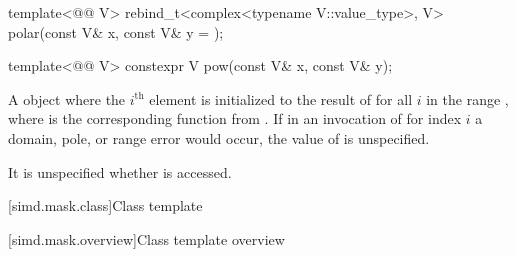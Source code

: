 \begin{itemdecl}
template<@@ V>
  rebind_t<complex<typename V::value_type>, V> polar(const V& x, const V& y = {});

template<@@ V> constexpr V pow(const V& x, const V& y);
\end{itemdecl}

\begin{itemdescr}
\pnum
\returns
A  object  where the $i^\text{th}$ element is
initialized to the result of 
for all $i$ in the range , where 
is the corresponding function from . If in an invocation of
 for index $i$ a domain, pole, or range error would
occur, the value of  is unspecified.

\pnum
\remarks
It is unspecified whether  is accessed.
\end{itemdescr}

[simd.mask.class]{Class template }

[simd.mask.overview]{Class template  overview}

